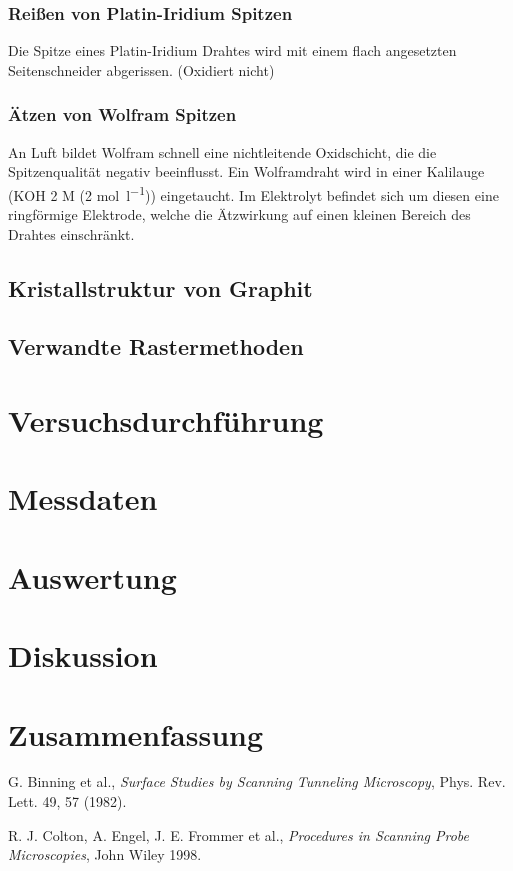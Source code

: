 \documentclass[10pt, a4paper]{article}
\begin{document}
\subsubsection{Reißen von Platin-Iridium Spitzen}
Die Spitze eines Platin-Iridium Drahtes wird mit einem flach angesetzten Seitenschneider abgerissen. (Oxidiert nicht)

\subsubsection{Ätzen von Wolfram Spitzen}
An Luft bildet Wolfram schnell eine nichtleitende Oxidschicht, die die Spitzenqualität negativ beeinflusst.
Ein Wolframdraht wird in einer Kalilauge (KOH 2 M (2 \si{\mol\per\litre})) eingetaucht. Im Elektrolyt befindet sich um diesen eine ringförmige Elektrode, welche die Ätzwirkung auf einen kleinen Bereich des Drahtes einschränkt.

\subsection{Kristallstruktur von Graphit}

\subsection{Verwandte Rastermethoden}

\section{Versuchsdurchführung}

\section{Messdaten}

\section{Auswertung}

\section{Diskussion}

\section{Zusammenfassung}


\begin{thebibliography}{9}

  G. Binning et al.,
  \emph{Surface Studies by Scanning Tunneling Microscopy},
  Phys. Rev. Lett. 49, 57 (1982).

  R. J. Colton, A. Engel, J. E. Frommer et al.,
  \emph{Procedures in Scanning Probe Microscopies},
  John Wiley 1998.
  
\end{thebibliography}
\end{document}
